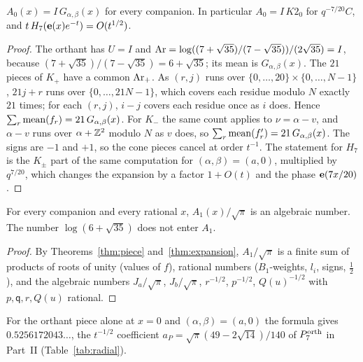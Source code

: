 \begin{corollary}[Order $t^{-1}$]\label{cor:A0}
$A_0(x)=I\,G_{\alpha,\beta}(x)$ for every companion. In particular $A_0=I\,K2_0$ for $q^{-7/20}C$, and $t\,H_7(\mathbf{e}(x)e^{-t})=O(t^{1/2})$.
\end{corollary}
\begin{proof}
The orthant has $U=I$ and $\mathrm{Ar}=\log((7+\sqrt{35})/(7-\sqrt{35}))/(2\sqrt{35})=I$, because $(7+\sqrt{35})/(7-\sqrt{35})=6+\sqrt{35}$; its mean is
$G_{\alpha,\beta}(x)$. The $21$ pieces of $K_+$ have a common $\mathrm{Ar}_+$. As $(r,j)$ runs over $\{0,\dots,20\}\times\{0,\dots,N-1\}$, $21j+r$ runs over
$\{0,\dots,21N-1\}$, which covers each residue modulo $N$ exactly $21$ times; for each $(r,j)$, $i-j$ covers each residue once as $i$ does. Hence
$\sum_r\operatorname{mean}(f_r)=21\,G_{\alpha,\beta}(x)$. For $K_-$ the same count applies to $\nu=\alpha-v$, and $\alpha-v$ runs over $\alpha+\mathbb{Z}^2$ modulo $N$ as $v$ does,
so $\sum_r\operatorname{mean}(f'_r)=21\,G_{\alpha,\beta}(x)$. The signs are $-1$ and $+1$, so the cone pieces cancel at order $t^{-1}$. The statement for $H_7$ is
the $K_\pm$ part of the same computation for $(\alpha,\beta)=(a,0)$, multiplied by $q^{7/20}$, which changes the expansion by a factor $1+O(t)$
and the phase $\mathbf{e}(7x/20)$.
\end{proof}

\begin{corollary}\label{cor:A1alg}
For every companion and every rational $x$, $A_1(x)/\sqrt\pi$ is an algebraic number. The number $\log(6+\sqrt{35})$ does not enter $A_1$.
\end{corollary}
\begin{proof}
By Theorems~\ref{thm:piece} and~\ref{thm:expansion}, $A_1/\sqrt\pi$ is a finite sum of products of roots of unity (values of $f$), rational numbers
($B_1$-weights, $l_i$, signs, $\frac12$), and the algebraic numbers $J_a/\sqrt\pi$, $J_b/\sqrt\pi$, $r^{-1/2}$, $p^{-1/2}$, $Q(u)^{-1/2}$ with $p,\mathsf q,r,Q(u)$ rational.
\end{proof}
\begin{remark}
For the orthant piece alone at $x=0$ and $(\alpha,\beta)=(a,0)$ the formula gives $0.5256172043\ldots$, the $t^{-1/2}$ coefficient $a_P=\sqrt\pi(49-2\sqrt{14})/140$
of $P^{\mathrm{orth}}_7$ in Part~II (Table~\ref{tab:radial}).
\end{remark}

